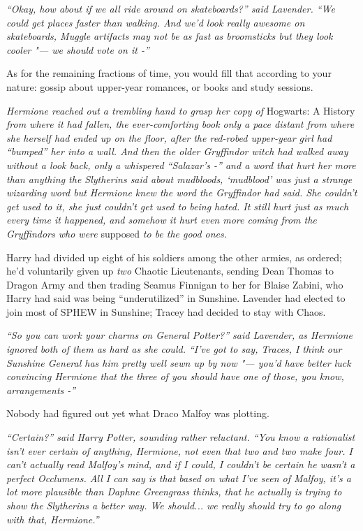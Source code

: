 \emph{``Okay, how about if we all ride around on skateboards?'' said
Lavender. ``We could get places faster than walking. And we'd look
really awesome on skateboards, Muggle artifacts may not be as fast as
broomsticks but they look cooler "--- we should vote on it -''}

As for the remaining fractions of time, you would fill that according to
your nature: gossip about upper-year romances, or books and study
sessions.

\emph{Hermione reached out a trembling hand to grasp her copy of}
Hogwarts: A History \emph{from where it had fallen, the ever-comforting
book only a pace distant from where she herself had ended up on the
floor, after the red-robed upper-year girl had ``bumped'' her into a
wall. And then the older Gryffindor witch had walked away without a look
back, only a whispered ``Salazar's -'' and a word that hurt her more
than anything the Slytherins said about mudbloods, `mudblood' was just a
strange wizarding word but Hermione knew the word the Gryffindor had
said. She couldn't get used to it, she just couldn't get used to being
hated. It still hurt just as much every time it happened, and somehow it
hurt even more coming from the Gryffindors who were} supposed \emph{to
be the good ones.}

Harry had divided up eight of his soldiers among the other armies, as
ordered; he'd voluntarily given up \emph{two} Chaotic Lieutenants,
sending Dean Thomas to Dragon Army and then trading Seamus Finnigan to
her for Blaise Zabini, who Harry had said was being ``underutilized'' in
Sunshine. Lavender had elected to join most of SPHEW in Sunshine; Tracey
had decided to stay with Chaos.

\emph{``So you can work your charms on General Potter?'' said Lavender,
as Hermione ignored both of them as hard as she could. ``I've got to
say, Traces, I think our Sunshine General has him pretty well sewn up by
now "--- you'd have better luck convincing Hermione that the three of you
should have one of those, you know, arrangements -''}

Nobody had figured out yet what Draco Malfoy was plotting.

\emph{``Certain?'' said Harry Potter, sounding rather reluctant. ``You
know a rationalist isn't ever certain of anything, Hermione, not even
that two and two make four. I can't actually read Malfoy's mind, and if
I could, I couldn't be certain he wasn't a perfect Occlumens. All I can
say is that based on what I've seen of Malfoy, it's a lot more plausible
than Daphne Greengrass thinks, that he actually is trying to show the
Slytherins a better way. We should... we really should try to go
along with that, Hermione.''}

